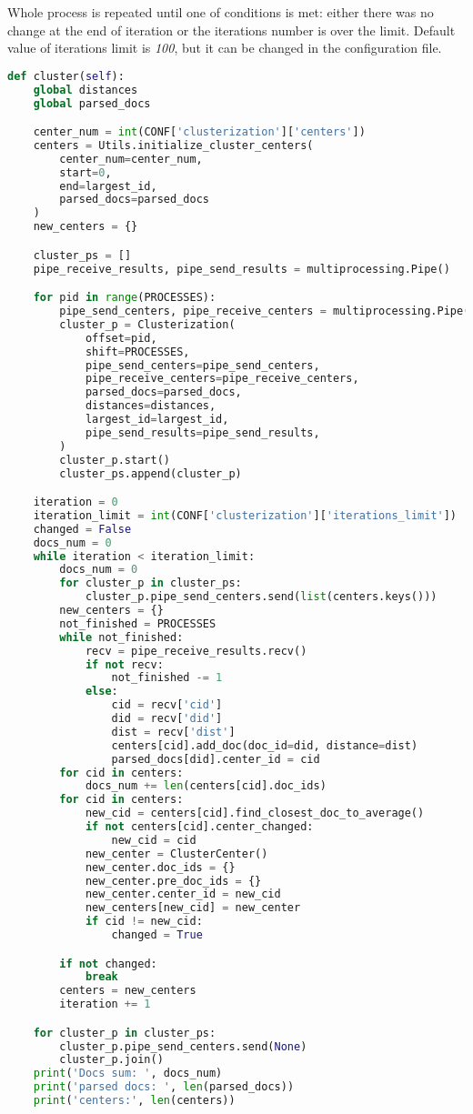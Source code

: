 Whole process is repeated until one of conditions is met: either there was no change at the end of iteration or the iterations number is over the limit. Default value of iterations limit is \textit{100}, but it can be changed in the configuration file.

\begin{lstlisting}[language=Python, caption={Main.cluster() - Main process method for conducting clustering}, label={lst:main:cluster}]
def cluster(self):
    global distances
    global parsed_docs

    center_num = int(CONF['clusterization']['centers'])
    centers = Utils.initialize_cluster_centers(
        center_num=center_num,
        start=0,
        end=largest_id,
        parsed_docs=parsed_docs
    )
    new_centers = {}

    cluster_ps = []
    pipe_receive_results, pipe_send_results = multiprocessing.Pipe()

    for pid in range(PROCESSES):
        pipe_send_centers, pipe_receive_centers = multiprocessing.Pipe()
        cluster_p = Clusterization(
            offset=pid,
            shift=PROCESSES,
            pipe_send_centers=pipe_send_centers,
            pipe_receive_centers=pipe_receive_centers,
            parsed_docs=parsed_docs,
            distances=distances,
            largest_id=largest_id,
            pipe_send_results=pipe_send_results,
        )
        cluster_p.start()
        cluster_ps.append(cluster_p)

    iteration = 0
    iteration_limit = int(CONF['clusterization']['iterations_limit'])
    changed = False
    docs_num = 0
    while iteration < iteration_limit:
        docs_num = 0
        for cluster_p in cluster_ps:
            cluster_p.pipe_send_centers.send(list(centers.keys()))
        new_centers = {}
        not_finished = PROCESSES
        while not_finished:
            recv = pipe_receive_results.recv()
            if not recv:
                not_finished -= 1
            else:
                cid = recv['cid']
                did = recv['did']
                dist = recv['dist']
                centers[cid].add_doc(doc_id=did, distance=dist)
                parsed_docs[did].center_id = cid
        for cid in centers:
            docs_num += len(centers[cid].doc_ids)
        for cid in centers:
            new_cid = centers[cid].find_closest_doc_to_average()
            if not centers[cid].center_changed:
                new_cid = cid
            new_center = ClusterCenter()
            new_center.doc_ids = {}
            new_center.pre_doc_ids = {}
            new_center.center_id = new_cid
            new_centers[new_cid] = new_center
            if cid != new_cid:
                changed = True

        if not changed:
            break
        centers = new_centers
        iteration += 1

    for cluster_p in cluster_ps:
        cluster_p.pipe_send_centers.send(None)
        cluster_p.join()
    print('Docs sum: ', docs_num)
    print('parsed docs: ', len(parsed_docs))
    print('centers:', len(centers))
\end{lstlisting}

